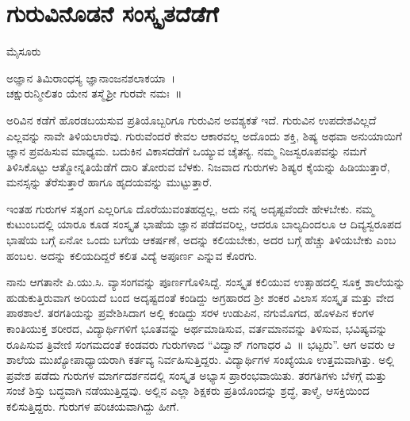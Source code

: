 {\fontsize{14}{16}\selectfont
\chapter{ಗುರುವಿನೊಡನೆ ಸಂಸ್ಕೃತದೆಡೆಗೆ}

\begin{center}
\smallskip

ಮೈಸೂರು
\addrule
\end{center}

\begin{center}
ಅಜ್ಞಾನ ತಿಮಿರಾಂಧಸ್ಯ ಜ್ಞಾನಾಂಜನಶಲಾಕಯಾ~।\\
ಚಕ್ಷುರುನ್ಮೀಲಿತಂ ಯೇನ ತಸ್ಮೈಶ್ರೀ ಗುರವೇ ನಮಃ~॥
\end{center}
ಅರಿವಿನ ಕಡೆಗೆ ಹೊರಡಬಯಸುವ ಪ್ರತಿಯೊಬ್ಬರಿಗೂ ಗುರುವಿನ ಅವಶ್ಯಕತೆ ಇದೆ. ಗುರುವಿನ ಉಪದೇಶವಿಲ್ಲದೆ ಎಲ್ಲವನ್ನು ನಾವೇ ತಿಳಿಯಲಾರೆವು. ಗುರುವೆಂದರೆ ಕೇವಲ ಆಕಾರವಲ್ಲ ಅದೊಂದು ಶಕ್ತಿ, ಶಿಷ್ಯ ಅಥವಾ ಅನುಯಾಯಿಗೆ ಜ್ಞಾನ ಪ್ರವಹಿಸುವ ಮಾಧ್ಯಮ. ಬದುಕಿನ ವಿಕಾಸದೆಡೆಗೆ ಒಯ್ಯುವ ಚೈತನ್ಯ. ನಮ್ಮ ನಿಜಸ್ವರೂಪವನ್ನು ನಮಗೆ ತಿಳಿಸಿಕೊಟ್ಟು ಆತ್ಮೋನ್ನತಿಯೆಡೆಗೆ ದಾರಿ ತೋರುವ ಬೆಳಕು. ನಿಜವಾದ ಗುರುಗಳು ಶಿಷ್ಯರ ಕೈಯನ್ನು ಹಿಡಿಯುತ್ತಾರೆ, ಮನಸ್ಸನ್ನು ತೆರೆಸುತ್ತಾರೆ ಹಾಗೂ ಹೃದಯವನ್ನು ಮುಟ್ಟುತ್ತಾರೆ.

ಇಂತಹ ಗುರುಗಳ ಸತ್ಸಂಗ ಎಲ್ಲರಿಗೂ ದೊರೆಯುವಂತಹದ್ದಲ್ಲ, ಅದು ನನ್ನ ಅದೃಷ್ಟವೆಂದೇ ಹೇಳಬೇಕು. ನಮ್ಮ ಕುಟುಂಬದಲ್ಲಿ ಯಾರೂ ಕೂಡ ಸಂಸ್ಕೃತ ಭಾಷೆಯ ಜ್ಞಾನ ಪಡೆದವರಿಲ್ಲ, ಆದರೂ ಬಾಲ್ಯದಿಂದಲೂ ಆ ದಿವ್ಯಸ್ವರೂಪದ ಭಾಷೆಯ ಬಗ್ಗೆ ಏನೋ ಒಂದು ಬಗೆಯ ಆಕರ್ಷಣೆ, ಅದನ್ನು ಕಲಿಯಬೇಕು, ಅದರ ಬಗ್ಗೆ ಹೆಚ್ಚು ತಿಳಿಯಬೇಕು ಎಂಬ ಹಂಬಲ. ಅದನ್ನು ಕಲಿಯದಿದ್ದರೆ ಕಲಿತ ವಿದ್ಯೆ ಅಪೂರ್ಣ ಎನ್ನುವ ಕೊರಗು. 

ನಾನು ಆಗತಾನೇ ಪಿ.ಯು.ಸಿ. ವ್ಯಾಸಂಗವನ್ನು ಪೂರ್ಣಗೊಳಿಸಿದ್ದೆ. ಸಂಸ್ಕೃತ ಕಲಿಯುವ ಉತ್ಸಾಹದಲ್ಲಿ ಸೂಕ್ತ ಶಾಲೆಯನ್ನು ಹುಡುಕುತ್ತಿರುವಾಗ ಅರಿಯದೆ ಬಂದ ಅದೃಷ್ಟ\-ದಂತೆ ಕಂಡಿದ್ದು ಅಗ್ರಹಾರದ ಶ್ರೀ ಶಂಕರ ವಿಲಾಸ ಸಂಸ್ಕೃತ ಮತ್ತು ವೇದ ಪಾಠಶಾಲೆ. ತರಗತಿಯನ್ನು ಪ್ರವೇಶಿಸಿದಾಗ ಅಲ್ಲಿ ಕಂಡಿದ್ದು ಸರಳ ಉಡುಪಿನ, ನಗು\-ಮೊಗದ, ಹೊಳಪಿನ ಕಂಗಳ ಕಾಂತಿಯುಕ್ತ ಶರೀರದ, ವಿದ್ಯಾರ್ಥಿಗಳಿಗೆ ಭೂತವನ್ನು ಅರ್ಥ\-ಮಾಡಿಸುವ, ವರ್ತಮಾನವನ್ನು ತಿಳಿಸುವ, ಭವಿಷ್ಯವನ್ನು ರೂಪಿಸುವ ತ್ರಿವೇಣಿ ಸಂಗಮದಂತೆ ಕಂಡವರು ಗುರುಗಳಾದ “ವಿದ್ವಾನ್ ಗಂಗಾಧರ ವಿ~॥ ಭಟ್ಟರು”. ಆಗ ಅವರು ಆ ಶಾಲೆಯ ಮುಖ್ಯೋಪಾಧ್ಯಾಯರಾಗಿ ಕರ್ತವ್ಯ ನಿರ್ವಹಿಸುತ್ತಿದ್ದರು. ವಿದ್ಯಾರ್ಥಿ\-ಗಳ ಸಂಖ್ಯೆಯೂ ಉತ್ತಮವಾಗಿತ್ತು. ಅಲ್ಲಿ ಪ್ರವೇಶ ಪಡೆದು ಗುರುಗಳ ಮಾರ್ಗದರ್ಶನದಲ್ಲಿ ಸಂಸ್ಕೃತ ಅಭ್ಯಾಸ ಪ್ರಾರಂಭವಾಯಿತು. ತರಗತಿಗಳು ಬೆಳಗ್ಗೆ ಮತ್ತು ಸಂಜೆ ಶಿಸ್ತು ಬದ್ಧವಾಗಿ ನಡೆಯುತ್ತಿದ್ದವು. ಅಲ್ಲಿನ ಎಲ್ಲಾ ಶಿಕ್ಷಕರು ಪ್ರತಿಯೊಂದನ್ನು ಶ್ರದ್ಧೆ, ತಾಳ್ಮೆ, ಆಸಕ್ತಿಯಿಂದ ಕಲಿಸುತ್ತಿದ್ದರು. ಗುರುಗಳ ಪರಿಚಯವಾಗಿದ್ದು ಹೀಗೆ.

}

